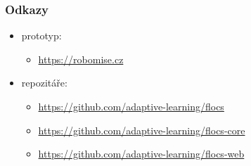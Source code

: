 \documentclass[xcolor=dvipsnames, 14pt]{beamer}
\begin{document}
\begin{frame}
\frametitle{Odkazy}
\begin{itemize}
\item prototyp:
  \begin{itemize}
  \item \footnotesize{\url{https://robomise.cz}}
  \end{itemize}
\item repozitáře:
  \begin{itemize}
  \item \footnotesize{\url{https://github.com/adaptive-learning/flocs}}
  \item \footnotesize{\url{https://github.com/adaptive-learning/flocs-core}}
  \item \footnotesize{\url{https://github.com/adaptive-learning/flocs-web}}
  \end{itemize}
\end{itemize}
\end{frame}
\end{document}
